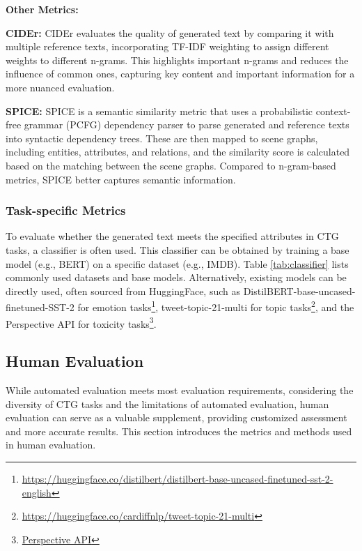 \documentclass[acmsmall, screen]{acmart}
\begin{document}
\textbf{Other Metrics:} 

\textbf{CIDEr\cite{vedantam_cvpr15_cider}:} CIDEr evaluates the quality of generated text by comparing it with multiple reference texts, incorporating TF-IDF weighting to assign different weights to different n-grams. This highlights important n-grams and reduces the influence of common ones, capturing key content and important information for a more nuanced evaluation.

\textbf{SPICE\cite{anderson_eccv16_spice}:} SPICE is a semantic similarity metric that uses a probabilistic context-free grammar (PCFG) dependency parser to parse generated and reference texts into syntactic dependency trees. These are then mapped to scene graphs, including entities, attributes, and relations, and the similarity score is calculated based on the matching between the scene graphs. Compared to n-gram-based metrics, SPICE better captures semantic information.

\subsubsection{\textbf{Task-specific Metrics}}
To evaluate whether the generated text meets the specified attributes in CTG tasks, a classifier is often used. This classifier can be obtained by training a base model (e.g., BERT) on a specific dataset (e.g., IMDB). Table \ref{tab:classifier} lists commonly used datasets and base models. Alternatively, existing models can be directly used, often sourced from HuggingFace, such as DistilBERT-base-uncased-finetuned-SST-2 for emotion tasks\footnote{\href{https://huggingface.co/distilbert/distilbert-base-uncased-finetuned-sst-2-english}{https://huggingface.co/distilbert/distilbert-base-uncased-finetuned-sst-2-english}}, tweet-topic-21-multi for topic tasks\footnote{\href{https://huggingface.co/cardiffnlp/tweet-topic-21-multi}{https://huggingface.co/cardiffnlp/tweet-topic-21-multi}}, and the Perspective API for toxicity tasks\footnote{\href{https://perspectiveapi.com/}{Perspective API}}.



\subsection{Human Evaluation}
While automated evaluation meets most evaluation requirements, considering the diversity of CTG tasks and the limitations of automated evaluation, human evaluation can serve as a valuable supplement, providing customized assessment and more accurate results. This section introduces the metrics and methods used in human evaluation.
\end{document}
